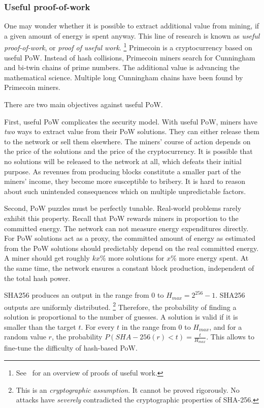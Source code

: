 \subsubsection*{Useful proof-of-work}

One may wonder whether it is possible to extract additional value from mining, if a given amount of energy is spent anyway.
This line of research is known as \textit{useful proof-of-work}, or \textit{proof of useful work}.
\footnote{See~\cite{Ball2017} for an overview of proofs of useful work.}
Primecoin is a cryptocurrency based on useful PoW.
Instead of hash collisions, Primecoin miners search for Cunningham and bi-twin chains of prime numbers.
The additional value is advancing the mathematical science.
Multiple long Cunningham chains have been found by Primecoin miners.

There are two main objectives against useful PoW.

First, useful PoW complicates the security model.
With useful PoW, miners have \textit{two} ways to extract value from their PoW solutions.
They can either release them to the network or sell them elsewhere.
The miners' course of action depends on the price of the solutions and the price of the cryptocurrency.
It is possible that no solutions will be released to the network at all, which defeats their initial purpose.
As revenues from producing blocks constitute a smaller part of the miners' income, they become more susceptible to bribery.
It is hard to reason about such unintended consequences which on multiple unpredictable factors.

Second, PoW puzzles must be perfectly tunable.
Real-world problems rarely exhibit this property.
Recall that PoW rewards miners in proportion to the committed energy.
The network can not measure energy expenditures directly.
For PoW solutions act as a proxy, the committed amount of energy as estimated from the PoW solutions should predictably depend on the real committed energy.
A miner should get roughly $kx\%$ more solutions for $x\%$ more energy spent.
At the same time, the network ensures a constant block production, independent of the total hash power.

SHA256 produces an output in the range from $0$ to $H_{max} = 2^{256}-1$.
SHA256 outputs are uniformly distributed.
\footnote{This is an \textit{cryptographic assumption}. It cannot be proved rigorously. No attacks have \textit{severely} contradicted the cryptographic properties of SHA-256.}
Therefore, the probability of finding a solution is proportional to the number of guesses.
A solution is valid if it is smaller than the target $t$.
For every $t$ in the range from $0$ to $H_{max}$, and for a random value $r$, the probability $P(SHA-256(r) < t) = \frac{t}{H_{max}}$.
This allows to fine-tune the difficulty of hash-based PoW.

